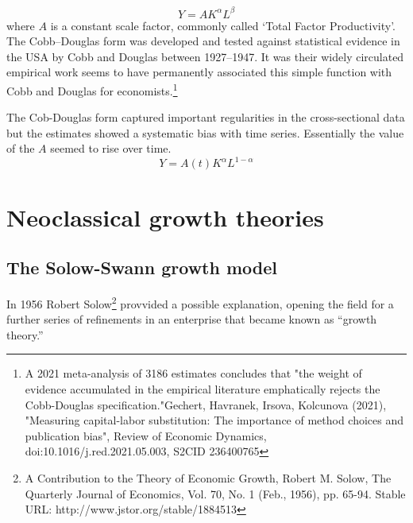  \[Y=AK^\alpha L^\beta\]
 where $A$ is a constant scale factor, commonly called `Total Factor Productivity'. The Cobb–Douglas form was developed and tested against statistical evidence  in the USA by Cobb and Douglas between 1927–1947. It was  their widely circulated empirical work seems to have permanently associated this simple function with Cobb and Douglas for economists.\footnote{ A 2021 meta-analysis of 3186 estimates concludes that "the weight of evidence accumulated in the empirical literature emphatically rejects the Cobb-Douglas specification."Gechert, Havranek, Irsova, Kolcunova (2021), "Measuring capital-labor substitution: The importance of method choices and publication bias", Review of Economic Dynamics, doi:10.1016/j.red.2021.05.003, S2CID 236400765}

The Cob-Douglas form captured  important regularities in the cross-sectional data but the estimates showed a systematic bias with time series. Essentially the value of the $A$ seemed to rise over time.
 \[Y=A(t)K^\alpha L^{1-\alpha}\]

  \section{Neoclassical growth theories}  

 \subsection{The Solow-Swann growth model}
In 1956 Robert Solow\footnote{A Contribution to the Theory of Economic Growth,  Robert M. Solow, The Quarterly Journal of Economics, Vol. 70, No. 1 (Feb., 1956), pp. 65-94. Stable URL: http://www.jstor.org/stable/1884513} provvided a possible explanation, opening the field for a further series of refinements  in an enterprise that became known as ``growth theory.'' 

